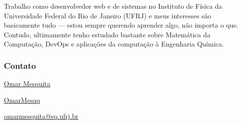 \documentclass{article}
\begin{document}
  
  Trabalho como desenvolvedor web e de sistemas no Instituto de Física da Universidade Federal do Rio de Janeiro (UFRJ) e meus 
  interesses são basicamente tudo --- estou sempre querendo aprender algo, não importa o que. Contudo, ultimamente tenho estudado 
  bastante sobre Matemática da Computação, DevOps e aplicações da computação à Engenharia Química.

  \subsubsection{Contato}

   \hspace{1ex} \href{https://www.linkedin.com/in/omar-mesquita/}{Omar Mesquita}


  	\hspace{1ex} \href{https://github.com/OmarMesqq}{OmarMesqq}
  
 
   \hspace{1ex} \href{mailto:omarmesquita@eq.ufrj.br}{omarmesquita@eq.ufrj.br}
  
\end{document}
